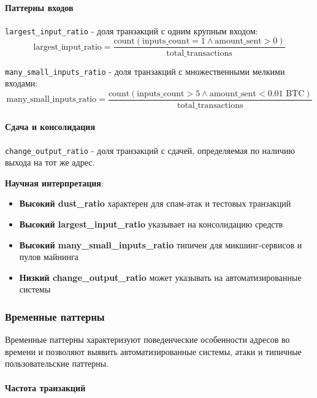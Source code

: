 \paragraph{Паттерны входов}

\texttt{largest\_input\_ratio} - доля транзакций с одним крупным входом:
\begin{equation}
    \text{largest\_input\_ratio} = \frac{\text{count}(\text{inputs\_count} = 1 \land \text{amount\_sent} > 0)}{\text{total\_transactions}}
\end{equation}

\texttt{many\_small\_inputs\_ratio} - доля транзакций с множественными мелкими входами:
\begin{equation}
    \text{many\_small\_inputs\_ratio} = \frac{\text{count}(\text{inputs\_count} > 5 \land \text{amount\_sent} < 0.01 \text{ BTC})}{\text{total\_transactions}}
\end{equation}

\paragraph{Сдача и консолидация}

\texttt{change\_output\_ratio} - доля транзакций с сдачей, определяемая по наличию выхода на тот же адрес.

\textbf{Научная интерпретация}:
\begin{itemize}
    \item \textbf{Высокий dust\_ratio} характерен для спам-атак и тестовых транзакций
    \item \textbf{Высокий largest\_input\_ratio} указывает на консолидацию средств
    \item \textbf{Высокий many\_small\_inputs\_ratio} типичен для микшинг-сервисов и пулов майнинга
    \item \textbf{Низкий change\_output\_ratio} может указывать на автоматизированные системы
\end{itemize}

\subsubsection{Временные паттерны}

Временные паттерны характеризуют поведенческие особенности адресов во времени и позволяют выявить автоматизированные системы, атаки и типичные пользовательские паттерны.

\paragraph{Частота транзакций}


